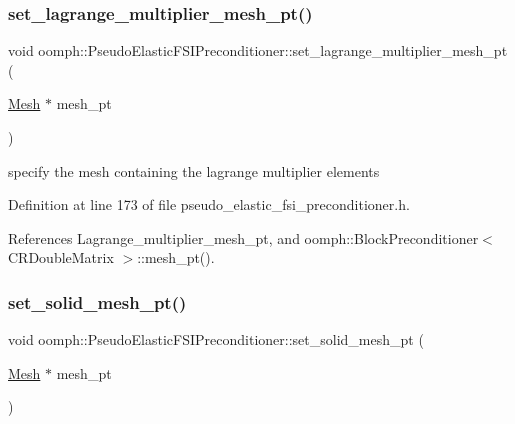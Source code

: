 \subsubsection{\texorpdfstring{set\+\_\+lagrange\+\_\+multiplier\+\_\+mesh\+\_\+pt()}{set\_lagrange\_multiplier\_mesh\_pt()}}
{\footnotesize\ttfamily void oomph\+::\+Pseudo\+Elastic\+F\+S\+I\+Preconditioner\+::set\+\_\+lagrange\+\_\+multiplier\+\_\+mesh\+\_\+pt (\begin{DoxyParamCaption}\item[{\hyperlink{classoomph_1_1Mesh}{Mesh} $\ast$}]{mesh\+\_\+pt }\end{DoxyParamCaption})\hspace{0.3cm}{\ttfamily [inline]}}



specify the mesh containing the lagrange multiplier elements 



Definition at line 173 of file pseudo\+\_\+elastic\+\_\+fsi\+\_\+preconditioner.\+h.



References Lagrange\+\_\+multiplier\+\_\+mesh\+\_\+pt, and oomph\+::\+Block\+Preconditioner$<$ C\+R\+Double\+Matrix $>$\+::mesh\+\_\+pt().

\mbox{\label{classoomph_1_1PseudoElasticFSIPreconditioner_af2c1fc8d2dd795c5a4a2ae266ad32d18}} 
\subsubsection{\texorpdfstring{set\+\_\+solid\+\_\+mesh\+\_\+pt()}{set\_solid\_mesh\_pt()}}
{\footnotesize\ttfamily void oomph\+::\+Pseudo\+Elastic\+F\+S\+I\+Preconditioner\+::set\+\_\+solid\+\_\+mesh\+\_\+pt (\begin{DoxyParamCaption}\item[{\hyperlink{classoomph_1_1Mesh}{Mesh} $\ast$}]{mesh\+\_\+pt }\end{DoxyParamCaption})\hspace{0.3cm}{\ttfamily [inline]}}



